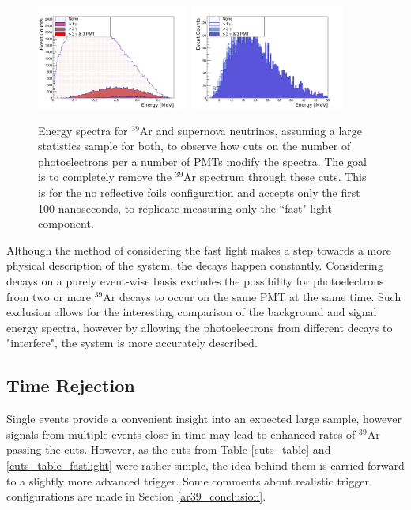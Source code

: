 \documentclass[a4paper]{article}
\begin{document}
\begin{figure}[H]
\center
\includegraphics[width=0.45\textwidth]{ar39_energy_spectrum_60pmts_vuv_fastlight_labels.pdf}
\includegraphics[width=0.45\textwidth]{sn_energy_spectrum_60pmts_vuv_fastlight_labels.pdf}
\caption{Energy spectra for $^{39}$Ar and supernova neutrinos, assuming a large statistics sample for both, to observe how cuts on the number of photoelectrons per a number of PMTs modify the spectra. The goal is to completely remove the $^{39}$Ar spectrum through these cuts. This is for the no reflective foils configuration and accepts only the first 100 nanoseconds, to replicate measuring only the ``fast" light component.}\label{scint_energy_cuts_vuv_fastlight}
\end{figure}

Although the method of considering the fast light makes a step towards a more physical description of the system, the decays happen constantly. Considering decays on a purely event-wise basis excludes the possibility for photoelectrons from two or more $^{39}$Ar decays to occur on the same PMT at the same time. Such exclusion allows for the interesting comparison of the background and signal energy spectra, however by allowing the photoelectrons from different decays to "interfere", the system is more accurately described. 

\subsection{Time Rejection}\label{time_rejection}

Single events provide a convenient insight into an expected large sample, however signals from multiple events close in time may lead to enhanced rates of $^{39}$Ar passing the cuts. However, as the cuts from Table \ref{cuts_table} and \ref{cuts_table_fastlight} were rather simple, the idea behind them is carried forward to a slightly more advanced trigger. Some comments about realistic trigger configurations are made in Section \ref{ar39_conclusion}.
\end{document}
